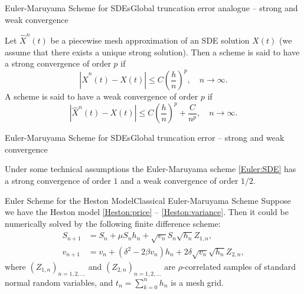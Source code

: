 \begin{frame}{Euler-Maruyama Scheme for SDEs}{Global truncation error analogue -- strong and weak convergence}
    \begin{definition}
        Let $\hat X^n(t)$ be a piecewise mesh approximation of an SDE solution $X(t)$ (we assume that there exists a unique strong solution). 
        Then a scheme is said to have a strong convergence of order $p$ if 
        \begin{equation}
            \left|\hat X^n(t) - X(t)\right| \leq C\left(\frac{h}{n}\right)^p, \quad n \to \infty.
        \end{equation}
        A scheme is said to have a weak convergence of order $p$ if
        \begin{equation}
            \left|\hat X^n(t) - X(t)\right| \leq C\left(\frac{h}{n}\right)^p + \frac{C}{n^p}, \quad n \to \infty.
        \end{equation}
    \end{definition}
    
\end{frame}

\begin{frame}{Euler-Maruyama Scheme for SDEs}{Global truncation error -- strong and weak convergence}
    \begin{theorem}
        Under some technical assumptions the Euler-Maruyama scheme \eqref{Euler:SDE} has a strong convergence of order $1$ and a weak convergence of order $1/2$.
    \end{theorem}
\end{frame}

\begin{frame}{Euler Scheme for the Heston Model}{Classical Euler-Maruyama Scheme}
    Suppose we have the Heston model \eqref{Heston:price} -- \eqref{Heston:variance}. Then it could be numerically solved by the following finite difference scheme:
    \begin{align}
        S_{n+1} & = S_n + \mu S_n h_n + \sqrt{v_n} S_n \sqrt{h_n} Z_{1,n}, \label{Euler:Heston:price}\\
        v_{n+1} & = v_n + \left(\delta^2 - 2\beta v_n\right) h_n + 2\delta \sqrt{v_n} \sqrt{h_n} Z_{2,n}, \label{Euler:Heston:variance}
    \end{align}
    where $(Z_{1,n})_{n=1, 2, \dots}$ and $(Z_{2,n})_{n=1, 2, \dots}$ are $\rho$-correlated samples of standard normal random variables, and $t_n = \sum_{k=0}^n h_n$ is a mesh grid.
\end{frame}


